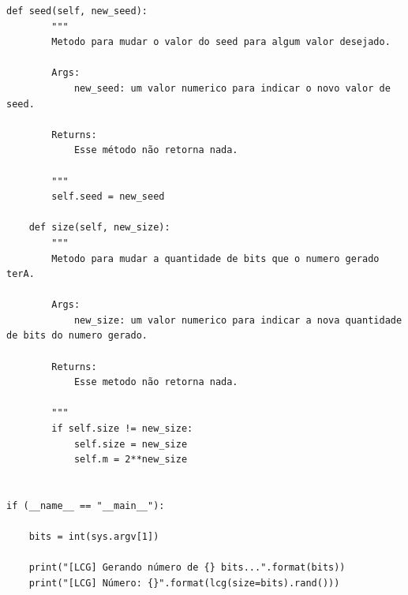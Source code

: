 \documentclass[a4paper,11pt]{article}
\theoremstyle{mytheor}
\begin{document}
\begin{lstlisting}[caption=Arquivo lcg.py.]
    def seed(self, new_seed):
        """
        Metodo para mudar o valor do seed para algum valor desejado.

        Args:
            new_seed: um valor numerico para indicar o novo valor de seed.

        Returns:
            Esse método não retorna nada.

        """
        self.seed = new_seed

    def size(self, new_size):
        """
        Metodo para mudar a quantidade de bits que o numero gerado terA.

        Args:
            new_size: um valor numerico para indicar a nova quantidade de bits do numero gerado.

        Returns:
            Esse metodo não retorna nada.

        """
        if self.size != new_size:
            self.size = new_size
            self.m = 2**new_size

 
if (__name__ == "__main__"):
    
    bits = int(sys.argv[1])

    print("[LCG] Gerando número de {} bits...".format(bits))
    print("[LCG] Número: {}".format(lcg(size=bits).rand()))
\end{lstlisting}
\end{document}
